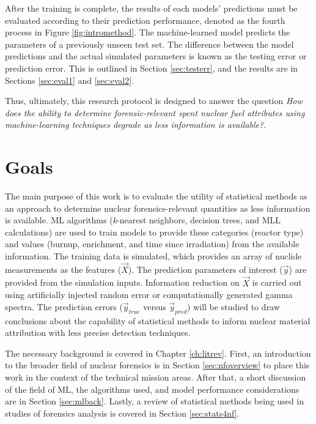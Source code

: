 After the training is complete, the results of each models' predictions must be
evaluated according to their prediction performance, denoted as the fourth
process in Figure \ref{fig:intromethod}.  The machine-learned model predicts
the parameters of a previously unseen test set.  The difference between the
model predictions and the actual simulated parameters is known as the testing
error or prediction error. This is outlined in Section \ref{sec:testerr}, and
the results are in Sections \ref{sec:eval1} and \ref{sec:eval2}.

Thus, ultimately, this research protocol is designed to answer the question
\textit{How does the ability to determine forensic-relevant spent nuclear fuel
attributes using machine-learning techniques degrade as less information is
available?}. 

\section{Goals}

The main purpose of this work is to evaluate the utility of statistical methods
as an approach to determine nuclear forensics-relevant quantities as less
information is available. \Gls{ML} algorithms (\textit{k}-nearest neighbors,
decision trees, and \gls{MLL}  calculations) are used to train models to provide
these categories (reactor type) and values (burnup, enrichment, and time since
irradiation) from the available information.  The training data is simulated,
which provides an array of nuclide measurements as the features ($\vec{X}$).
The prediction parameters of interest ($\vec{y}$) are provided from the
simulation inputs. Information reduction on $\vec{X}$ is carried out using
artificially injected random error or computationally generated gamma spectra.
The prediction errors ($\vec{y}_{true}$ versus $\vec{y}_{pred}$) will be
studied to draw conclusions about the capability of statistical methods to
inform nuclear material attribution with less precise detection techniques.

The necessary background is covered in Chapter \ref{ch:litrev}.  First, an
introduction to the broader field of nuclear forensics is in Section
\ref{sec:nfoverview} to place this work in the context of the technical mission
areas. After that, a short discussion of the field of \gls{ML}, the algorithms
used, and model performance considerations are in Section \ref{sec:mlback}.
Lastly, a review of statistical methods being used in studies of forensics
analysis is covered in Section \ref{sec:stats4nf}. 

